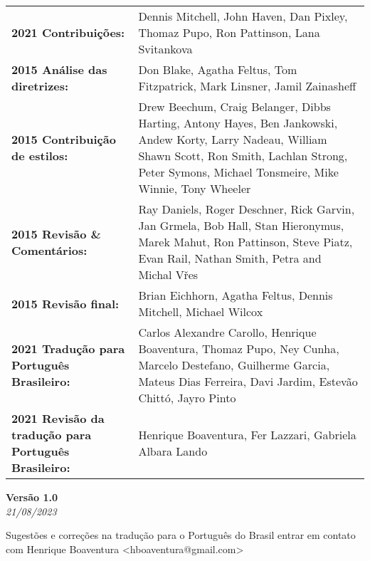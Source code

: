 \begin{titlepage}
        \begin{tabular}{ m{5.5cm} m{12.5cm} }
            \textbf{2021 Contribuições:}	& Dennis Mitchell, John Haven, Dan Pixley, Thomaz Pupo, Ron Pattinson, Lana Svitankova \\
            \textbf{2015 Análise das diretrizes:} & Don Blake, Agatha Feltus, Tom Fitzpatrick, Mark Linsner, Jamil Zainasheff \\
            \textbf{2015 Contribuição de estilos:} & Drew Beechum, Craig Belanger, Dibbs Harting, Antony Hayes, Ben Jankowski, Andew Korty,
            Larry Nadeau, William Shawn Scott, Ron Smith, Lachlan Strong, Peter Symons, Michael Tonsmeire, Mike Winnie, Tony Wheeler \\
            \textbf{2015 Revisão \& Comentários:} & Ray Daniels, Roger Deschner, Rick Garvin, Jan Grmela, Bob Hall, Stan Hieronymus, Marek Mahut, Ron Pattinson, Steve Piatz, Evan Rail, Nathan Smith, Petra and Michal Vřes\\
            \textbf{2015 Revisão final:} & Brian Eichhorn, Agatha Feltus, Dennis Mitchell, Michael Wilcox  \\
            \textbf{2021 Tradução para Português Brasileiro:} & Carlos Alexandre Carollo, Henrique Boaventura, Thomaz Pupo, Ney Cunha, Marcelo Destefano, Guilherme Garcia, Mateus Dias Ferreira, Davi Jardim, Estevão Chittó, Jayro Pinto \\
            \textbf{2021 Revisão da tradução para Português Brasileiro:} & Henrique Boaventura, Fer Lazzari, Gabriela Albara Lando
        \end{tabular}

        \vspace{0.5cm}

        \textbf{Versão 1.0}\\
        \footnotesize{\textit{21/08/2023}}

        \vspace{0.4cm}

        \footnotesize{Sugestões e correções na tradução para o Português do Brasil entrar em contato com Henrique Boaventura <hboaventura@gmail.com>}

\end{titlepage}